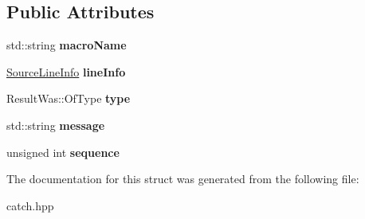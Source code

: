 \subsection*{Public Attributes}
\begin{DoxyCompactItemize}
\item 
\hypertarget{structCatch_1_1MessageInfo_a156ade4b3cc731f6ec7b542ae47ba8e3}{
std::string {\bfseries macroName}}
\label{structCatch_1_1MessageInfo_a156ade4b3cc731f6ec7b542ae47ba8e3}

\item 
\hypertarget{structCatch_1_1MessageInfo_a985165328723e599696ebd8e43195cc5}{
\hyperlink{structCatch_1_1SourceLineInfo}{SourceLineInfo} {\bfseries lineInfo}}
\label{structCatch_1_1MessageInfo_a985165328723e599696ebd8e43195cc5}

\item 
\hypertarget{structCatch_1_1MessageInfo_ae928b9117465c696e45951d9d0284e78}{
ResultWas::OfType {\bfseries type}}
\label{structCatch_1_1MessageInfo_ae928b9117465c696e45951d9d0284e78}

\item 
\hypertarget{structCatch_1_1MessageInfo_ab6cd06e050bf426c6577502a5c50e256}{
std::string {\bfseries message}}
\label{structCatch_1_1MessageInfo_ab6cd06e050bf426c6577502a5c50e256}

\item 
\hypertarget{structCatch_1_1MessageInfo_a7f4f57ea21e50160adefce7b68a781d6}{
unsigned int {\bfseries sequence}}
\label{structCatch_1_1MessageInfo_a7f4f57ea21e50160adefce7b68a781d6}

\end{DoxyCompactItemize}


The documentation for this struct was generated from the following file:\begin{DoxyCompactItemize}
\item 
catch.hpp\end{DoxyCompactItemize}
